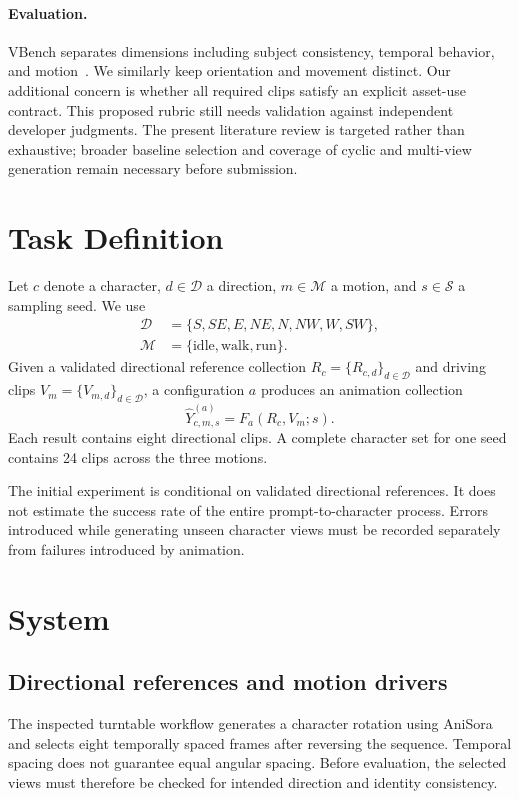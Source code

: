 \documentclass[11pt]{article}
\begin{document}
\paragraph{Evaluation.}
VBench separates dimensions including subject consistency, temporal behavior, and motion~\cite{vbench}. We similarly keep orientation and movement distinct. Our additional concern is whether all required clips satisfy an explicit asset-use contract. This proposed rubric still needs validation against independent developer judgments. The present literature review is targeted rather than exhaustive; broader baseline selection and coverage of cyclic and multi-view generation remain necessary before submission.

\section{Task Definition}
Let $c$ denote a character, $d\in\mathcal{D}$ a direction, $m\in\mathcal{M}$ a motion, and $s\in\mathcal{S}$ a sampling seed. We use
\begin{align}
\mathcal{D}&=\{S,SE,E,NE,N,NW,W,SW\},\\
\mathcal{M}&=\{\mathrm{idle},\mathrm{walk},\mathrm{run}\}.
\end{align}
Given a validated directional reference collection $R_c=\{R_{c,d}\}_{d\in\mathcal{D}}$ and driving clips $V_m=\{V_{m,d}\}_{d\in\mathcal{D}}$, a configuration $a$ produces an animation collection
\begin{equation}
\widehat{Y}^{(a)}_{c,m,s}=F_a(R_c,V_m;s).
\end{equation}
Each result contains eight directional clips. A complete character set for one seed contains 24 clips across the three motions.

The initial experiment is conditional on validated directional references. It does not estimate the success rate of the entire prompt-to-character process. Errors introduced while generating unseen character views must be recorded separately from failures introduced by animation.

\section{System}
\subsection{Directional references and motion drivers}
The inspected turntable workflow generates a character rotation using AniSora and selects eight temporally spaced frames after reversing the sequence. Temporal spacing does not guarantee equal angular spacing. Before evaluation, the selected views must therefore be checked for intended direction and identity consistency.
\end{document}
